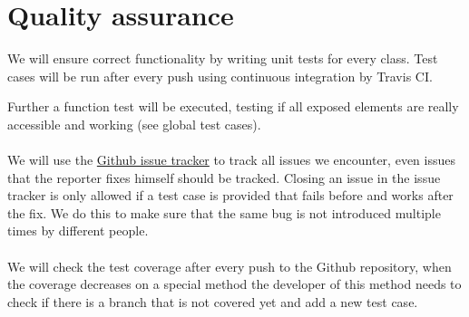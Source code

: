 \chapter{Quality assurance}
We will ensure correct functionality by writing unit tests for every class. Test cases will be run after every push using continuous integration by Travis CI.

Further a function test will be executed, testing if all exposed elements are really accessible and working (see global test cases).
\\\\
We will use the \hyperlink{https://github.com/rootjs/rootjs/issues }{Github issue tracker} to track all issues we encounter, even issues that the reporter fixes himself should be tracked.
Closing an issue in the issue tracker is only allowed if a test case is provided that fails before and works after the fix. We do this to make sure that the same bug is not introduced multiple times by different people.
\\\\
We will check the test coverage after every push to the Github repository, when the coverage decreases on a special method the developer of this method needs to check if there is a branch that is not covered yet and add a new test case.
